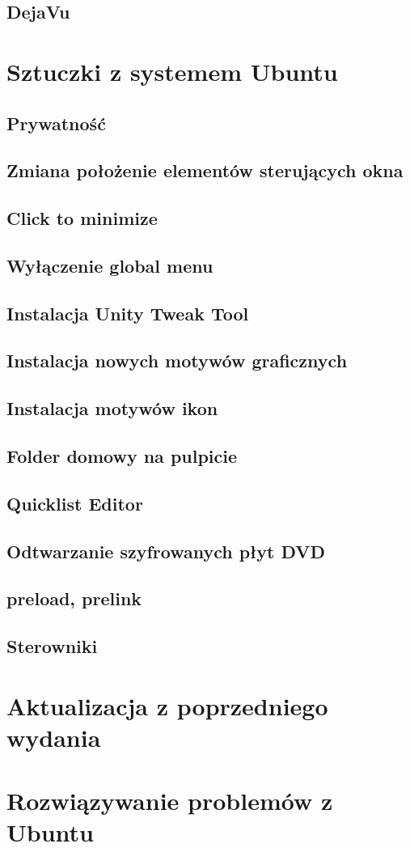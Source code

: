 \documentclass[a4paper,11pt,oneside]{mwart}
\begin{document}
        \subsection{DejaVu}
\section{Sztuczki z systemem Ubuntu}
        \subsection{Prywatność}
        \subsection{Zmiana położenie elementów sterujących okna}
        \subsection{Click to minimize}
        \subsection{Wyłączenie global menu}
        \subsection{Instalacja Unity Tweak Tool}
        \subsection{Instalacja nowych motywów graficznych}
        \subsection{Instalacja motywów ikon}
        \subsection{Folder domowy na pulpicie}
        \subsection{Quicklist Editor}
        \subsection{Odtwarzanie szyfrowanych płyt DVD}
        \subsection{preload, prelink}
        \subsection{Sterowniki}
        \label{sterowniki}
\section{Aktualizacja z poprzedniego wydania}
\section{Rozwiązywanie problemów z Ubuntu}
\end{document}
